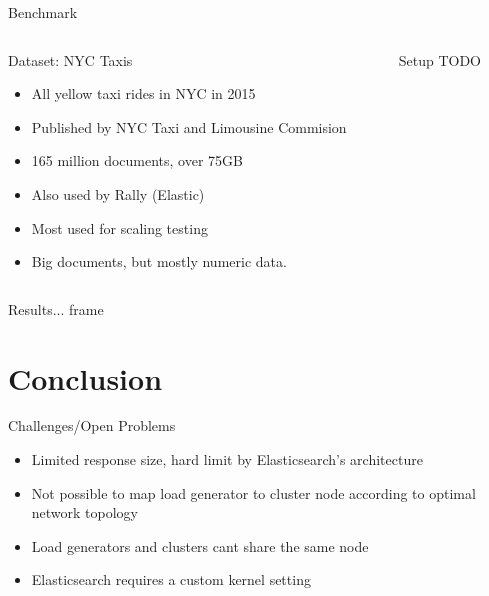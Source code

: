 \documentclass[compress,aspectratio=169]{beamer}
\begin{document}
  \begin{frame}{Benchmark}
    \begin{columns}
      \begin{column}{0.5\textwidth}
        \begin{block}{Dataset: NYC Taxis}
          \begin{itemize}
            \item All yellow taxi rides in NYC in 2015
            \item Published by NYC Taxi and Limousine Commision
            \item 165 million documents, over 75GB
            \item Also used by Rally (Elastic)
            \item Most used for scaling testing
            \item Big documents, but mostly numeric data.
          \end{itemize}
        \end{block}
      \end{column}
      \begin{column}{0.5\textwidth}
        \begin{block}{Setup}
          TODO
        \end{block}
      \end{column}
    \end{columns}
  \end{frame}

  \begin{frame}{Results...}
    frame
  \end{frame}

	\section{Conclusion}
  \begin{frame}{Challenges/Open Problems}
    \begin{itemize}
      \item Limited response size, hard limit by Elasticsearch's architecture
      \item Not possible to map load generator to cluster node according to optimal network topology
      \item Load generators and clusters cant share the same node
      \item Elasticsearch requires a custom kernel setting
    \end{itemize}
  \end{frame}
\end{document}
